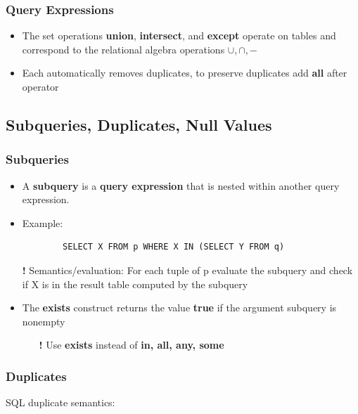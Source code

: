 \subsubsection{Query Expressions}
\begin{itemize}[label=\(\rhd\)]
    \item The set operations \textbf{union}, \textbf{intersect}, and \textbf{except} operate on tables and correspond to the relational algebra operations $\cup, \cap, -$
    \item Each automatically removes duplicates, to preserve duplicates add \textbf{all} after operator
\end{itemize}

\subsection{Subqueries, Duplicates, Null Values}

\subsubsection{Subqueries}

\begin{itemize}[label=\(\rhd\)]
    \item A \textbf{subquery} is a \textbf{query expression} that is nested within another query expression.
    \item Example:
    \begin{lstlisting}
        SELECT X FROM p WHERE X IN (SELECT Y FROM q)
    \end{lstlisting}
    \item[\textbf{!}] Semantics/evaluation: For each tuple of p evaluate the subquery and check if X is in the result table computed by the subquery
    \item The \textbf{exists} construct returns the value \textbf{true} if the argument subquery is nonempty
    \begin{itemize}[label=\(\rhd\)]
        \item[\textbf{!}] Use \textbf{exists} instead of \textbf{in, all, any, some}
    \end{itemize}
\end{itemize}

\subsubsection{Duplicates}

SQL duplicate semantics:\\

